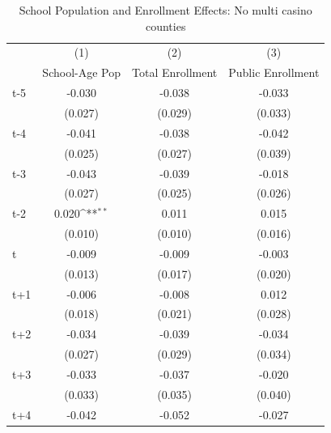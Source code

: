 \begin{table}[htbp]\centering
\def\sym#1{\ifmmode^{#1}\else\(^{#1}\)\fi}
\caption{School Population and Enrollment Effects: No multi casino counties}
\begin{tabular}{l*{3}{c}}
\hline\hline
            &\multicolumn{1}{c}{(1)}&\multicolumn{1}{c}{(2)}&\multicolumn{1}{c}{(3)}\\
            &\multicolumn{1}{c}{School-Age Pop}&\multicolumn{1}{c}{Total Enrollment}&\multicolumn{1}{c}{Public Enrollment}\\
\hline
t-5         &      -0.030         &      -0.038         &      -0.033         \\
            &     (0.027)         &     (0.029)         &     (0.033)         \\
[1em]
t-4         &      -0.041         &      -0.038         &      -0.042         \\
            &     (0.025)         &     (0.027)         &     (0.039)         \\
[1em]
t-3         &      -0.043         &      -0.039         &      -0.018         \\
            &     (0.027)         &     (0.025)         &     (0.026)         \\
[1em]
t-2         &       0.020\sym{**} &       0.011         &       0.015         \\
            &     (0.010)         &     (0.010)         &     (0.016)         \\
[1em]
t           &      -0.009         &      -0.009         &      -0.003         \\
            &     (0.013)         &     (0.017)         &     (0.020)         \\
[1em]
t+1         &      -0.006         &      -0.008         &       0.012         \\
            &     (0.018)         &     (0.021)         &     (0.028)         \\
[1em]
t+2         &      -0.034         &      -0.039         &      -0.034         \\
            &     (0.027)         &     (0.029)         &     (0.034)         \\
[1em]
t+3         &      -0.033         &      -0.037         &      -0.020         \\
            &     (0.033)         &     (0.035)         &     (0.040)         \\
[1em]
t+4         &      -0.042         &      -0.052         &      -0.027         \\

\end{tabular}
\end{table}
